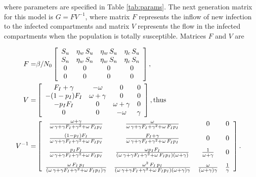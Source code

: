 \documentclass[12pt]{article}
\theoremstyle{definition} %
\begin{document}
where parameters are specified in Table \ref{tab:params}. The next generation matrix for this model is $G = F V^{-1}$, where matrix $F$ represents the inflow of new infection to the infected compartments and matrix $V$ represents the flow in the infected compartments when the population is totally susceptible. 
Matrices $F$ and $V$ are

\begin{align}
\label{FV}
F =& \beta/N_0 \left[ \begin {array}{cccc} 
S_u&\eta_w\,S_u&\eta_w\,S_u&\eta_c\,S_u\\
S_n&\eta_w\,S_n&\eta_w\,S_n&\eta_c\,S_n\\ 
0&0&0&0\\
0&0&0&0
 \end {array} \right], \\
  V =&
 \left[ \begin {array}{cccc}  
F_I+\gamma&-\omega&0&0\\
-(1-p_I)F_I&\omega+\gamma&0&0\\
-p_I F_I&0&\omega+\gamma&0\\
0&0&-\omega&\gamma
\end {array} \right], \text{thus}\\
V^{-1} =&
\left[ \begin {array}{cccc}
\frac {\omega+\gamma}{\omega\,\gamma+\gamma F_I+\gamma^2+\omega\, F_I p_I}&\frac {\omega}{\omega\,\gamma+\gamma F_I+\gamma^2+\omega\, F_I p_I}&0&0\\
\noalign{\medskip}
\frac{(1-p_I) F_I}{\omega\,\gamma+\gamma F_I+\gamma^2+\omega\, F_I p_I}&
\frac{F_I+\gamma}{\omega\,\gamma+\gamma F_I+\gamma^2+\omega\, F_I p_I}&0&0\\
\noalign{\medskip}
\frac{p_I F_I}{\omega\,\gamma+\gamma F_I+\gamma^2+\omega\, F_I p_I}&
\frac{\omega p_I F_I}{(\omega\,\gamma+\gamma F_I+\gamma^2+\omega\, F_I p_I)(\omega+\gamma)}& \frac{1}{\omega+\gamma}&0 \\
\noalign{\medskip}
\frac{\omega\,F_I\,p_I}{(\omega\,\gamma+\gamma F_I+\gamma^2+\omega\, F_I p_I) \gamma}& 
\frac{\omega^2\,F_I\,p_I}{(\omega\,\gamma+\gamma F_I+\gamma^2+\omega\, F_I p_I)(\omega+\gamma) \gamma}&
\frac{\omega}{(\omega+\gamma) \gamma}&
\frac{1}{\gamma}
\end {array} \right].
\end{align}
\end{document}
